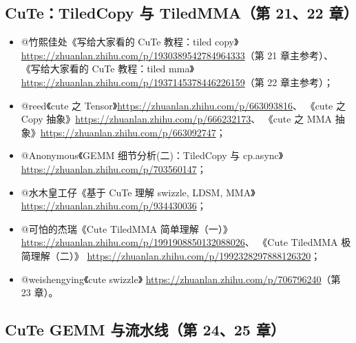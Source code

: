 \subsection{CuTe：TiledCopy 与 TiledMMA（第 21、22 章）}

\begin{itemize}
  \item @竹熙佳处《写给大家看的 CuTe 教程：tiled copy》
        \url{https://zhuanlan.zhihu.com/p/1930389542784964333}（第 21 章主参考）、
        《写给大家看的 CuTe 教程：tiled mma》
        \url{https://zhuanlan.zhihu.com/p/1937145378446226159}（第 22 章主参考）；
  \item @reed《cute 之 Tensor》\url{https://zhuanlan.zhihu.com/p/663093816}、
        《cute 之 Copy 抽象》\url{https://zhuanlan.zhihu.com/p/666232173}、
        《cute 之 MMA 抽象》\url{https://zhuanlan.zhihu.com/p/663092747}；
  \item @Anonymous《GEMM 细节分析(二)：TiledCopy 与 cp.async》
        \url{https://zhuanlan.zhihu.com/p/703560147}；
  \item @水木皇工仔《基于 CuTe 理解 swizzle, LDSM, MMA》
        \url{https://zhuanlan.zhihu.com/p/934430036}；
  \item @可怕的杰瑞《Cute TiledMMA 简单理解（一）》
        \url{https://zhuanlan.zhihu.com/p/1991908850132088026}、
        《Cute TiledMMA 极简理解（二）》
        \url{https://zhuanlan.zhihu.com/p/1992328297888126320}；
  \item @weishengying《cute swizzle》
        \url{https://zhuanlan.zhihu.com/p/706796240}（第 23 章）。
\end{itemize}

\subsection{CuTe GEMM 与流水线（第 24、25 章）}

